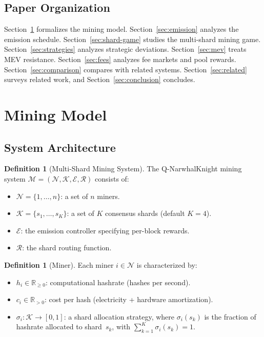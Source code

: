 \documentclass[11pt,a4paper]{article}
\theoremstyle{definition}
\newtheorem{definition}[theorem]{Definition}
\theoremstyle{remark}
\newcommand{\QNK}{\textsf{Q-NarwhalKnight}}
\newcommand{\strategy}{\sigma}
\newcommand{\Players}{\mathcal{N}}
\newcommand{\hashrate}{h}
\newcommand{\emission}{\mathcal{E}}
\newcommand{\R}{\mathbb{R}}
\begin{document}
\subsection{Paper Organization}

Section~\ref{sec:model} formalizes the mining model.
Section~\ref{sec:emission} analyzes the emission schedule.
Section~\ref{sec:shard-game} studies the multi-shard mining game.
Section~\ref{sec:strategies} analyzes strategic deviations.
Section~\ref{sec:mev} treats MEV resistance.
Section~\ref{sec:fees} analyzes fee markets and pool rewards.
Section~\ref{sec:comparison} compares with related systems.
Section~\ref{sec:related} surveys related work, and
Section~\ref{sec:conclusion} concludes.

\section{Mining Model}\label{sec:model}

\subsection{System Architecture}

\begin{definition}[Multi-Shard Mining System]\label{def:system}
The \QNK{} mining system $\mathcal{M} = (\Players, \mathcal{K},
\emission, \mathcal{R})$ consists of:
\begin{itemize}[nosep]
  \item $\Players = \{1, \ldots, n\}$: a set of $n$ miners.
  \item $\mathcal{K} = \{s_1, \ldots, s_K\}$: a set of $K$ consensus
    shards (default $K = 4$).
  \item $\emission$: the emission controller specifying per-block rewards.
  \item $\mathcal{R}$: the shard routing function.
\end{itemize}
\end{definition}

\begin{definition}[Miner]\label{def:miner}
Each miner $i \in \Players$ is characterized by:
\begin{itemize}[nosep]
  \item $\hashrate_i \in \R_{\geq 0}$: computational hashrate
    (hashes per second).
  \item $c_i \in \R_{> 0}$: cost per hash (electricity + hardware
    amortization).
  \item $\strategy_i: \mathcal{K} \to [0,1]$: a shard allocation
    strategy, where $\strategy_i(s_k)$ is the fraction of hashrate
    allocated to shard~$s_k$, with $\sum_{k=1}^K \strategy_i(s_k) = 1$.
\end{itemize}
\end{definition}
\end{document}
